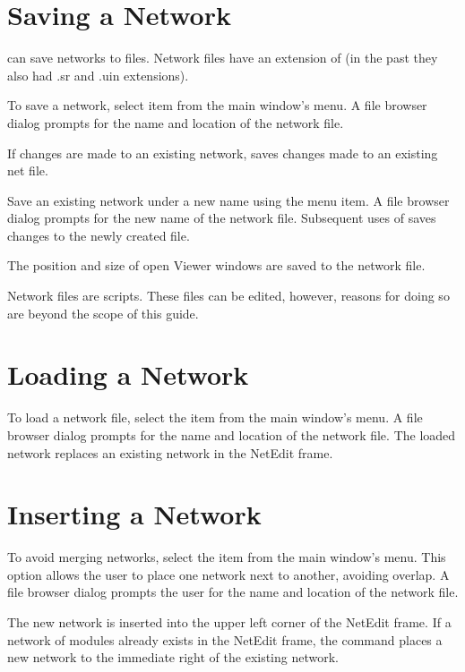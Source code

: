 \section{Saving a Network}
\label{sec:savenet}

\sr{} can save networks to files.  Network files have an extension of
 (in the past they also had .sr and .uin
extensions).  

To save a network, select item  from the main window's
 menu.  A file browser dialog prompts for the
name and location of the network file.

If changes are made to an existing network,  saves
changes made to an existing net file.

Save an existing network under a new name using the  menu item.  A file browser dialog prompts for the new name of
the network file.  Subsequent uses of  saves changes
to the newly created file.

The position and size of open Viewer windows are saved to
the network file.

Network files are   scripts.
These files can be edited, however, reasons for doing so are beyond
the scope of this guide.

\section{Loading a Network}
\label{sec:opennet}

To load a network file, select the  item from the main
window's  menu.   A file browser dialog prompts for the
name and location of the network file.  The loaded network replaces an
existing network in the NetEdit frame.

\section{Inserting a Network}
\label{sec:insertnetwork}

To avoid merging networks, select the
 item from the main window's  menu. This
option allows the user to place one \sr{} network next to another,
avoiding overlap.  A file browser dialog prompts the user for the name and
location of the network file.

The new network is inserted into the upper left corner of the
NetEdit frame.  If a network of modules already exists in the NetEdit
frame, the  command places a new network to the
immediate right of the existing network.

